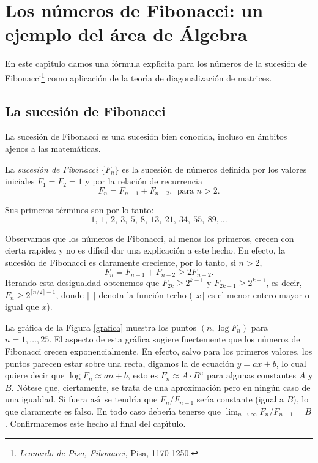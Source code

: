\chapter{Los n\'umeros de Fibonacci: un ejemplo del \'area de \'Algebra}
\label{CapituloFibonacci}

En este cap\'\i tulo damos una f\'ormula expl\'\i cita para los n\'umeros de la sucesi\'on de Fibonacci\footnote{\emph{Leonardo de Pisa, Fibonacci}, Pisa, 1170-1250.}
 como aplicaci\'on de la teor\'\i a de diagonalizaci\'on de matrices.

\section{La sucesi\'on de Fibonacci}
\label{Seccion1}

La sucesi\'on de Fibonacci es una sucesi\'on bien conocida, incluso en \'ambitos ajenos a las matem\'aticas.

\begin{definicion} La \emph{sucesi\'on de Fibonacci} $\{F_n\}$ es la sucesi\'on de n\'umeros definida por los valores iniciales $F_1=F_2=1$ y por la relaci\'on de recurrencia
\begin{equation}\label{Fibonacci}F_n=F_{n-1}+F_{n-2},\ \ \text{para } n>2.\end{equation}
\end{definicion}

Sus primeros t\'erminos son por lo tanto:
$$1,\  1,\  2,\  3,\  5,\  8,\  13,\  21,\  34,\  55,\  89,\dots $$

Observamos que los n\'umeros de Fibonacci, al menos los primeros, crecen con cierta rapidez y no es dif\'\i cil dar una explicaci\'on a este hecho. En efecto, la sucesi\'on de Fibonacci es claramente creciente, por lo tanto, si $n>2$,
$$F_n=F_{n-1}+F_{n-2}\geq 2F_{n-2}.$$
Iterando esta desigualdad obtenemos que $F_{2k}\geq 2^{k-1}$  y $F_{2k-1}\geq 2^{k-1}$, es decir,
$F_n\geq 2^{\lceil n/2\rceil-1}$, donde $\lceil\ \rceil$ denota la funci\'on techo ($\lceil x\rceil$ es el menor entero mayor o igual que $x$).

La gr\'afica de la Figura \ref{grafica}  muestra los puntos $(n,\log F_n)$ para $n=1,\dots,25$.  El aspecto de esta gr\'afica sugiere fuertemente que los n\'umeros de Fibonacci crecen exponencialmente. En efecto, salvo para los primeros valores, los puntos parecen estar sobre una recta, digamos la de ecuaci\'on $y=ax+b$, lo cual quiere decir que $\log F_n\approx an+b$, esto es $F_n\approx A\cdot B^n$ para algunas constantes $A$ y $B$. N\'otese que, ciertamente, se trata de una aproximaci\'on pero en ning\'un caso de una igualdad. Si fuera as\'\i\ se tendr\'\i a que $F_n/F_{n-1}$ ser\'\i a constante (igual a $B$), lo que claramente es falso. En todo caso deber\'\i a tenerse que $\lim_{n\to\infty} F_n/F_{n-1}=B$. Confirmaremos este hecho al final del cap\'\i tulo.

